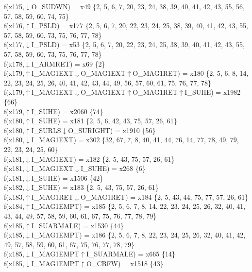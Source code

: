 f(x175,$\downarrow$O\_SUDWN) = x49 \{2, 5, 6, 7, 20, 23, 24, 38, 39, 40, 41, 42, 43, 55, 56, 57, 58, 59, 60, 74, 75\} \\  
f(x176,$\uparrow$I\_PSLD) = x177 \{2, 5, 6, 7, 20, 22, 23, 24, 25, 38, 39, 40, 41, 42, 43, 55, 57, 58, 59, 60, 73, 75, 76, 77, 78\} \\  
f(x177,$\downarrow$I\_PSLD) = x53 \{2, 5, 6, 7, 20, 22, 23, 24, 25, 38, 39, 40, 41, 42, 43, 55, 57, 58, 59, 60, 73, 75, 76, 77, 78\} \\  
f(x178,$\downarrow$I\_ARMRET) = x69 \{2\} \\  
f(x179,$\uparrow$I\_MAG1EXT$\downarrow$O\_MAG1EXT$\uparrow$O\_MAG1RET) = x180 \{2, 5, 6, 8, 14, 22, 23, 24, 25, 26, 40, 41, 42, 43, 44, 49, 56, 57, 60, 61, 75, 76, 77, 78\} \\  
f(x179,$\uparrow$I\_MAG1EXT$\downarrow$O\_MAG1EXT$\uparrow$O\_MAG1RET$\uparrow$I\_SUHE) = x1982 \{66\} \\  
f(x179,$\uparrow$I\_SUHE) = x2060 \{74\} \\  
f(x180,$\uparrow$I\_SUHE) = x181 \{2, 5, 6, 42, 43, 75, 57, 26, 61\} \\  
f(x180,$\uparrow$I\_SURLS$\downarrow$O\_SURIGHT) = x1910 \{56\} \\  
f(x180,$\downarrow$I\_MAG1EXT) = x302 \{32, 67, 7, 8, 40, 41, 44, 76, 14, 77, 78, 49, 79, 22, 23, 24, 25, 60\} \\  
f(x181,$\downarrow$I\_MAG1EXT) = x182 \{2, 5, 43, 75, 57, 26, 61\} \\  
f(x181,$\downarrow$I\_MAG1EXT$\downarrow$I\_SUHE) = x268 \{6\} \\  
f(x181,$\downarrow$I\_SUHE) = x1506 \{42\} \\  
f(x182,$\downarrow$I\_SUHE) = x183 \{2, 5, 43, 75, 57, 26, 61\} \\  
f(x183,$\uparrow$I\_MAG1RET$\downarrow$O\_MAG1RET) = x184 \{2, 5, 43, 44, 75, 77, 57, 26, 61\} \\  
f(x184,$\uparrow$I\_MAG1EMPT) = x185 \{2, 5, 6, 7, 8, 14, 22, 23, 24, 25, 26, 32, 40, 41, 43, 44, 49, 57, 58, 59, 60, 61, 67, 75, 76, 77, 78, 79\} \\  
f(x185,$\uparrow$I\_SUARMALE) = x1530 \{44\} \\  
f(x185,$\downarrow$I\_MAG1EMPT) = x186 \{2, 5, 6, 7, 8, 22, 23, 24, 25, 26, 32, 40, 41, 42, 49, 57, 58, 59, 60, 61, 67, 75, 76, 77, 78, 79\} \\  
f(x185,$\downarrow$I\_MAG1EMPT$\uparrow$I\_SUARMALE) = x665 \{14\} \\  
f(x185,$\downarrow$I\_MAG1EMPT$\uparrow$O\_CBFW) = x1518 \{43\} \\  
